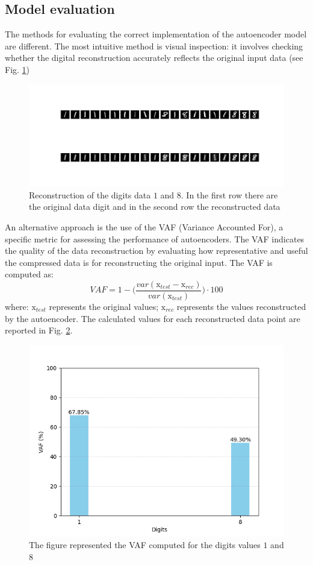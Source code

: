 \documentclass[9pt,technote]{IEEEtran}
\begin{document}
\subsection{Model evaluation}
The methods for evaluating the correct implementation of the autoencoder model are different.
The most intuitive method is visual inspection: it involves checking whether the digital reconstruction accurately reflects the original input data (see Fig. \ref{fig:digitalrecostruction})
\begin{figure}
	\centering
	\includegraphics[width=0.7\linewidth]{Resources/DigitalRecostruction}
	\caption{Reconstruction of the digits data $1$ and $8$. In the first row there are the original data digit and in the second row the reconstructed data}
	\label{fig:digitalrecostruction}
\end{figure}

An alternative approach is the use of the VAF (Variance Accounted For), a specific metric for assessing the performance of autoencoders. The VAF indicates the quality of the data reconstruction by evaluating how representative and useful the compressed data is for reconstructing the original input. The VAF is computed as:
\begin{equation*}
	VAF = 1 - \Big(\frac{var(\text{x}_{test} - \text{x}_{rec})}{var(\text{x}_{test})}\Big) \cdot 100
\end{equation*}
where:
$\text{x}_{test}$ represents the original values;
$\text{x}_{rec}$ represents the values reconstructed by the autoencoder.
The calculated values for each reconstructed data point are reported in Fig. \ref{fig:varianceaccountedfor}.
\begin{figure}
	\centering
	\includegraphics[width=0.7\linewidth]{Resources/VarianceAccountedFor}
	\caption{The figure represented the VAF computed for the digits values $1$ and $8$}
	\label{fig:varianceaccountedfor}
\end{figure}
\end{document}
